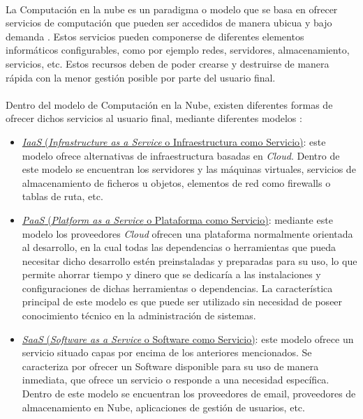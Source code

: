 \documentclass[../../memoria.tex]{subfiles}
\begin{document}
\paragraph{}
La Computación en la nube es un paradigma o modelo que se basa en ofrecer servicios de computación que pueden ser accedidos de manera ubicua y bajo demanda \cite{nist}. Estos servicios pueden componerse de diferentes elementos informáticos configurables, como por ejemplo redes, servidores, almacenamiento, servicios, etc. Estos recursos deben de poder crearse y destruirse de manera rápida con la menor gestión posible por parte del usuario final.

\paragraph{}
Dentro del modelo de Computación en la Nube, existen diferentes formas de ofrecer dichos servicios al usuario final, mediante diferentes modelos \cite{xaas}:

\begin{itemize}
    \item \uline{\textit{IaaS} (\textit{Infrastructure as a Service} o Infraestructura como Servicio)}: este modelo ofrece alternativas de infraestructura basadas en \textit{Cloud}. Dentro de este modelo se encuentran los servidores y las máquinas virtuales, servicios de almacenamiento de ficheros u objetos, elementos de red como firewalls o tablas de ruta, etc.

    \item \uline{\textit{PaaS} (\textit{Platform as a Service} o Plataforma como Servicio)}: mediante este modelo los proveedores \textit{Cloud} ofrecen una plataforma normalmente orientada al desarrollo, en la cual todas las dependencias o herramientas que pueda necesitar dicho desarrollo estén preinstaladas y preparadas para su uso, lo que permite ahorrar tiempo y dinero que se dedicaría a las instalaciones y configuraciones de dichas herramientas o dependencias. La característica principal de este modelo es que puede ser utilizado sin necesidad de poseer conocimiento técnico en la administración de sistemas.

    \item \uline{\textit{SaaS} (\textit{Software as a Service} o Software como Servicio)}: este modelo ofrece un servicio situado capas por encima de los anteriores mencionados. Se caracteriza por ofrecer un Software disponible para su uso de manera inmediata, que ofrece un servicio o responde a una necesidad específica. Dentro de este modelo se encuentran los proveedores de email, proveedores de almacenamiento en Nube, aplicaciones de gestión de usuarios, etc.
\end{itemize}
\end{document}
